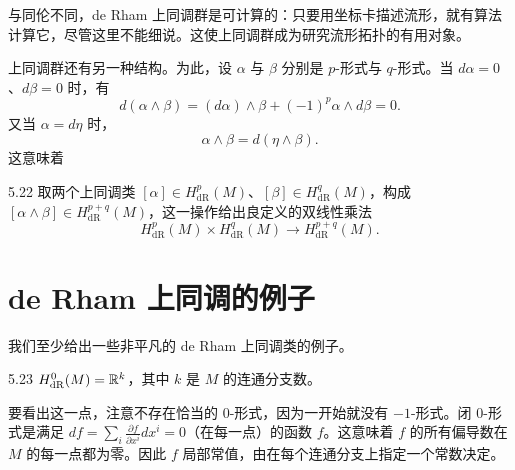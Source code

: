 与同伦不同，de Rham 上同调群是可计算的：只要用坐标卡描述流形，就有算法计算它，尽管这里不能细说。这使上同调群成为研究流形拓扑的有用对象。

上同调群还有另一种结构。为此，设 $\alpha$ 与 $\beta$ 分别是 $p$-形式与 $q$-形式。当 $d\alpha=0$、$d\beta=0$ 时，有
\begin{equation}
  d(\alpha\wedge\beta)=(d\alpha)\wedge\beta+(-1)^p\alpha\wedge d\beta=0.
  \tag{5.38}
\end{equation}
又当 $\alpha=d\eta$ 时，
\begin{equation}
  \alpha\wedge\beta=d(\eta\wedge\beta).
  \tag{5.39}
\end{equation}
这意味着

\begin{proposition}{5.22}
  取两个上同调类 $[\alpha]\in H^p_{\mathrm{dR}}(M)$、$[\beta]\in H^q_{\mathrm{dR}}(M)$，构成 $[\alpha\wedge\beta]\in H^{p+q}_{\mathrm{dR}}(M)$，这一操作给出良定义的双线性乘法
  \begin{equation}
    H^p_{\mathrm{dR}}(M)\times H^q_{\mathrm{dR}}(M)\to H^{p+q}_{\mathrm{dR}}(M).
    \tag{5.40}
  \end{equation}
\end{proposition}


\section{de Rham 上同调的例子}

我们至少给出一些非平凡的 de Rham 上同调类的例子。

\begin{proposition}{5.23}
  $H^0_{\mathrm{dR}}(M)=\mathbb{R}^k$，其中 $k$ 是 $M$ 的连通分支数。
\end{proposition}

要看出这一点，注意不存在恰当的 0-形式，因为一开始就没有 $-1$-形式。闭 0-形式是满足 $df=\sum_i\frac{\partial f}{\partial x^i}dx^i=0$（在每一点）的函数 $f$。这意味着 $f$ 的所有偏导数在 $M$ 的每一点都为零。因此 $f$ 局部常值，由在每个连通分支上指定一个常数决定。

